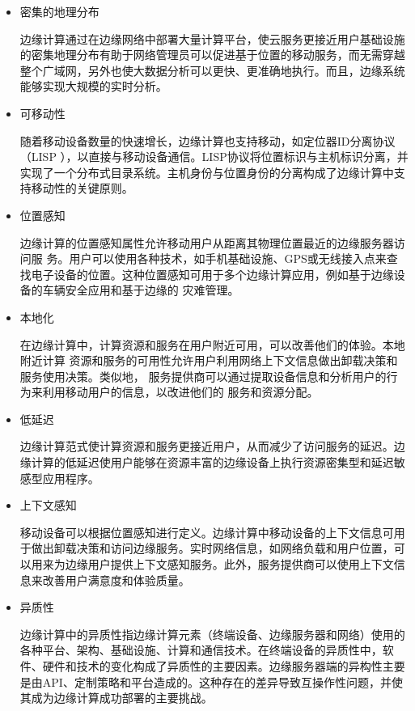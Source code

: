 \documentclass[UTF8,12pt,twoside,a4paper]{ctexart} %
\begin{document}
\begin{itemize}
\item 密集的地理分布

边缘计算通过在边缘网络中部署大量计算平台，使云服务更接近用户基础设施的密集地理分布有助于网络管理员可以促进基于位置的移动服务，而无需穿越整个广域网，另外也使大数据分析可以更快、更准确地执行。而且，边缘系统能够实现大规模的实时分析。

\item 可移动性

随着移动设备数量的快速增长，边缘计算也支持移动，如定位器ID分离协议（LISP ），以直接与移动设备通信。LISP协议将位置标识与主机标识分离，并实现了一个分布式目录系统。主机身份与位置身份的分离构成了边缘计算中支持移动性的关键原则。 

\item 位置感知

边缘计算的位置感知属性允许移动用户从距离其物理位置最近的边缘服务器访问服 务。用户可以使用各种技术，如手机基础设施、GPS或无线接入点来查找电子设备的位置。这种位置感知可用于多个边缘计算应用，例如基于边缘设备的车辆安全应用和基于边缘的 灾难管理。 

\item 本地化

在边缘计算中，计算资源和服务在用户附近可用，可以改善他们的体验。本地附近计算 资源和服务的可用性允许用户利用网络上下文信息做出卸载决策和服务使用决策。类似地， 服务提供商可以通过提取设备信息和分析用户的行为来利用移动用户的信息，以改进他们的 服务和资源分配。

\item 低延迟

边缘计算范式使计算资源和服务更接近用户，从而减少了访问服务的延迟。边缘计算的低延迟使用户能够在资源丰富的边缘设备上执行资源密集型和延迟敏感型应用程序。

\item 上下文感知

移动设备可以根据位置感知进行定义。边缘计算中移动设备的上下文信息可用于做出卸载决策和访问边缘服务。实时网络信息，如网络负载和用户位置，可以用来为边缘用户提供上下文感知服务。此外，服务提供商可以使用上下文信息来改善用户满意度和体验质量。 

\item 异质性

边缘计算中的异质性指边缘计算元素（终端设备、边缘服务器和网络）使用的各种平台、架构、基础设施、计算和通信技术。在终端设备的异质性中，软件、硬件和技术的变化构成了异质性的主要因素。边缘服务器端的异构性主要是由API、定制策略和平台造成的。这种存在的差异导致互操作性问题，并使其成为边缘计算成功部署的主要挑战。
\end{itemize}
\end{document}
